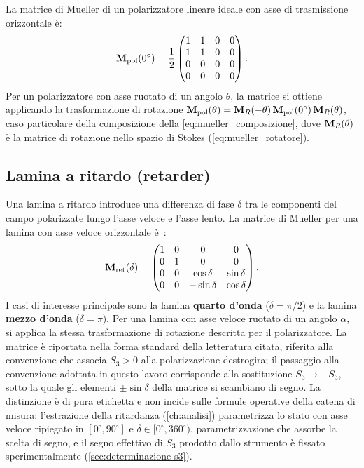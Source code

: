 La matrice di Mueller di un polarizzatore lineare ideale con asse di trasmissione orizzontale è:
\begin{equation}
\label{eq:mueller_pol}
\mathbf{M}_\text{pol}(0^\circ) = \frac{1}{2}\begin{pmatrix} 1 & 1 & 0 & 0 \\ 1 & 1 & 0 & 0 \\ 0 & 0 & 0 & 0 \\ 0 & 0 & 0 & 0 \end{pmatrix}.
\end{equation}
Per un polarizzatore con asse ruotato di un angolo $\theta$, la matrice si ottiene applicando la trasformazione di rotazione $\mathbf{M}_\text{pol}(\theta) = \mathbf{M}_R(-\theta)\,\mathbf{M}_\text{pol}(0^\circ)\,\mathbf{M}_R(\theta)$, caso particolare della composizione della \cref{eq:mueller_composizione}, dove $\mathbf{M}_R(\theta)$ è la matrice di rotazione nello spazio di Stokes (\cref{eq:mueller_rotatore}).

\subsection{Lamina a ritardo (retarder)}
\label{subsec:mueller_retarder}

Una lamina a ritardo introduce una differenza di fase $\delta$ tra le componenti del campo polarizzate lungo l'asse veloce e l'asse lento. La matrice di Mueller per una lamina con asse veloce orizzontale è~\cite{collett2005polarized}:
\begin{equation}
\label{eq:mueller_retarder}
\mathbf{M}_\text{ret}(\delta) = \begin{pmatrix} 1 & 0 & 0 & 0 \\ 0 & 1 & 0 & 0 \\ 0 & 0 & \cos\delta & \sin\delta \\ 0 & 0 & -\sin\delta & \cos\delta \end{pmatrix}.
\end{equation}
I casi di interesse principale sono la lamina \textbf{quarto d'onda} ($\delta = \pi/2$) e la lamina \textbf{mezzo d'onda} ($\delta = \pi$). Per una lamina con asse veloce ruotato di un angolo $\alpha$, si applica la stessa trasformazione di rotazione descritta per il polarizzatore. La matrice è riportata nella forma standard della letteratura citata, riferita alla convenzione che associa $S_3 > 0$ alla polarizzazione destrogira; il passaggio alla convenzione adottata in questo lavoro corrisponde alla sostituzione $S_3 \rightarrow -S_3$, sotto la quale gli elementi $\pm\sin\delta$ della matrice si scambiano di segno. La distinzione è di pura etichetta e non incide sulle formule operative della catena di misura: l'estrazione della ritardanza (\cref{ch:analisi}) parametrizza lo stato con asse veloce ripiegato in $[0^\circ, 90^\circ]$ e $\delta \in [0^\circ, 360^\circ)$, parametrizzazione che assorbe la scelta di segno, e il segno effettivo di $S_3$ prodotto dallo strumento è fissato sperimentalmente (\cref{sec:determinazione-s3}).

